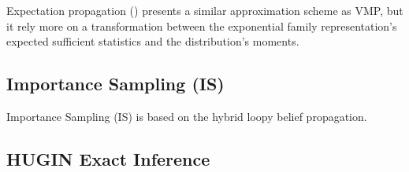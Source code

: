 Expectation propagation () \cite{Minka2001} presents a similar approximation scheme as VMP, but it rely more on a transformation between the exponential family representation's expected sufficient statistics and the distribution's moments.


\subsection{Importance Sampling (IS)} \label{IS}

Importance Sampling (IS) \cite{Yuan2007} is based on the hybrid loopy belief propagation.

\subsection{HUGIN Exact Inference} \label{HuginInference}

